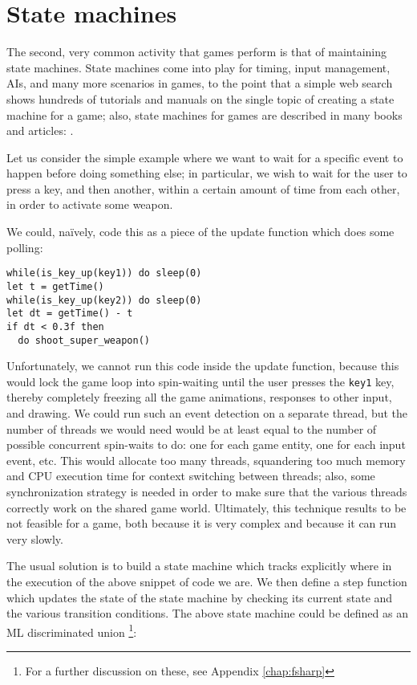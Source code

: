 \section{State machines}
The second, very common activity that games perform is that of maintaining state machines. State machines come into play for timing, input management, AIs, and many more scenarios in games, to the point that a simple web search shows hundreds of tutorials and manuals on the single topic of creating a state machine for a game; also, state machines for games are described in many books and articles: \cite{GP_GEMS_5, CHAPTER_2_STATE_MACHINES2, CHAPTER_2_STATE_MACHINES3, CHAPTER_2_STATE_MACHINES4}.

Let us consider the simple example where we want to wait for a specific event to happen before doing something else; in particular, we wish to wait for the user to press a key, and then another, within a certain amount of time from each other, in order to activate some weapon.

We could, naïvely, code this as a piece of the update function which does some polling:

\begin{lstlisting}
while(is_key_up(key1)) do sleep(0)
let t = getTime()
while(is_key_up(key2)) do sleep(0)
let dt = getTime() - t
if dt < 0.3f then
  do shoot_super_weapon()
\end{lstlisting}

Unfortunately, we cannot run this code inside the update function, because this would lock the game loop into spin-waiting until the user presses the \texttt{key1} key, thereby completely freezing all the game animations, responses to other input, and drawing. We could run such an event detection on a separate thread, but the number of threads we would need would be at least equal to the number of possible concurrent spin-waits to do: one for each game entity, one for each input event, etc. This would allocate too many threads, squandering too much memory and CPU execution time for context switching between threads; also, some synchronization strategy is needed in order to make sure that the various threads correctly work on the shared game world. Ultimately, this technique results to be not feasible for a game, both because it is very complex and because it can run very slowly.

The usual solution is to build a state machine which tracks explicitly where in the execution of the above snippet of code we are. We then define a step function which updates the state of the state machine by checking its current state and the various transition conditions. The above state machine could be defined as an ML discriminated union \footnote{For a further discussion on these, see Appendix \ref{chap:fsharp}}:

